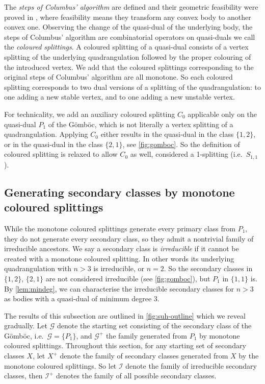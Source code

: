 \documentclass[]{article}
\newcommand{\suh}{$\mathcal{I}^+$\xspace}
\newcommand{\col}{$\mathcal{G}^+$\xspace}
\newcommand{\Gomboc}{Gömböc\xspace}
\begin{document}
The \emph{steps of Columbus' algorithm} are defined and their geometric feasibility were proved in \cite{Domokos2006}, where feasibility means they transform any convex body to another convex one.
Observing the change of the quasi-dual of the underlying body, the steps of Columbus' algorithm are combinatorial operators on quasi-duals we call the \emph{coloured splittings}.
A coloured splitting of a quasi-dual consists of a vertex splitting of the underlying quadrangulation followed by the proper colouring of the introduced vertex.
We add that the coloured splittings corresponding to the original steps of Columbus' algorithm are all monotone.
So each coloured splitting corresponds to two dual versions of a splitting of the quadrangulation: to one adding a new stable vertex, and to one adding a new unstable vertex.

For technicality, we add an auxiliary coloured splitting $C_0$ applicable only on the quasi-dual $P_1$ of the \Gomboc, which is not literally a vertex splitting of a quadrangulation.
Applying $C_0$ either results in the quasi-dual in the class $\{1,2\}$, or in the quasi-dual in the class $\{2,1\}$, see \autoref{fig:gomboc}.
So the definition of coloured splitting is relaxed to allow $C_0$ as well, considered a 1-splitting (i.e.\  $S_{1,1}$).


\subsection{Generating secondary classes by monotone coloured splittings}

While the monotone coloured splittings generate every primary class from $P_1$, they do not generate every secondary class, so they admit a nontrivial family of irreducible ancestors.
We say a secondary class is \emph{irreducible} if it cannot be created with a monotone coloured splitting.
In other words its underlying quadrangulation with $n>3$ is irreducible, or $n=2$.
So the secondary classes in $\{1,2\}$, $\{2,1\}$ are not considered irreducible (see \autoref{fig:gomboc}), but $P_1$ in $\{1,1\}$ is.
By \autoref{lem:mindeg}, we can characterise the irreducible secondary classes for $n>3$ as bodies with a quasi-dual of minimum degree 3.

The results of this subsection are outlined in \autoref{fig:suh-outline} which we reveal gradually. Let $\mathcal{G}$ denote the starting set consisting of the secondary class of the \Gomboc, i.e.\  $\mathcal{G}=\{P_1\}$, and \col the family generated from $P_1$ by monotone coloured splittings.
Throughout this section, for any starting set of secondary classes $X$, let $X^+$ denote the family of secondary classes generated from $X$ by the monotone coloured splittings.
So let $\mathcal{I}$ denote the family of irreducible secondary classes, then \suh denotes the family of all possible secondary classes.
\end{document}
